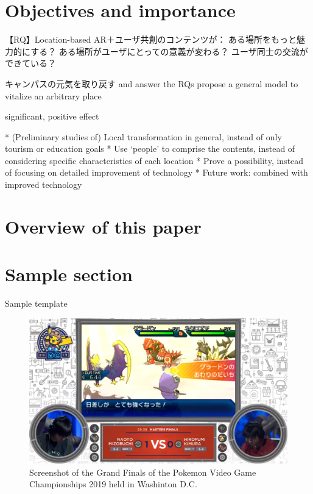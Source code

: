 \section{Objectives and importance}
【RQ】Location-based AR＋ユーザ共創のコンテンツが：
ある場所をもっと魅力的にする？
ある場所がユーザにとっての意義が変わる？
ユーザ同士の交流ができている？

キャンパスの元気を取り戻す and answer the RQs
propose a general model to vitalize an arbitrary place

significant, positive effect

* (Preliminary studies of) Local transformation in general, instead of only tourism or education goals
* Use ‘people’ to comprise the contents, instead of considering specific characteristics of each location
* Prove a possibility, instead of focusing on detailed improvement of technology
    * Future work: combined with improved technology

\section{Overview of this paper}

\section{Sample section}

Sample template \cite{alphago}

\begin{figure}
  \centering
  \includegraphics[width=\columnwidth]{resources/1_intro/vgc2019.png}
    \caption{Screenshot of the Grand Finals of the Pokemon Video Game Championships 2019 held in Washinton D.C.}
\end{figure}

